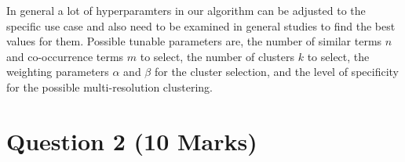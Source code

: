 In general a lot of hyperparamters in our algorithm can be adjusted to the specific use case and also need to be examined in general studies to find the best values for them. Possible tunable parameters are, the number of similar terms $n$ and co-occurrence terms $m$ to select, the number of clusters $k$ to select, the weighting parameters $\alpha$ and $\beta$ for the cluster selection, and the level of specificity for the possible multi-resolution clustering.


\newpage
\section{Question 2 (10 Marks)}



